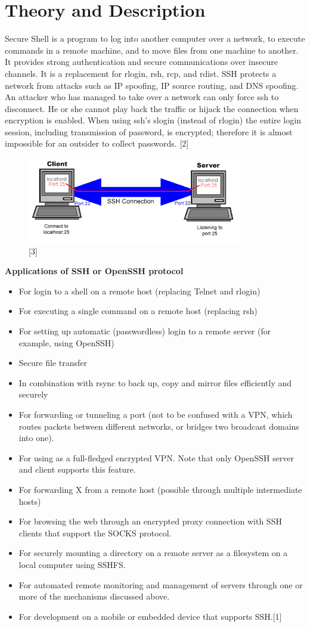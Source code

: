 \documentclass[11pt,a4paper]{article}
\begin{document}
	\section{Theory and Description}
	Secure Shell is a program to log into another computer over a network, to execute commands in a remote machine, and to move files from one machine to another. It provides strong authentication and secure communications over insecure channels. It is a replacement for rlogin, rsh, rcp, and rdist.
	SSH protects a network from attacks such as IP spoofing, IP source routing, and DNS spoofing. An attacker who has managed to take over a network can only force ssh to disconnect. He or she cannot play back the traffic or hijack the connection when encryption is enabled.
	When using ssh's slogin (instead of rlogin) the entire login session, including transmission of password, is encrypted; therefore it is almost impossible for an outsider to collect passwords. [2]
	\begin{figure}[h!]
		\includegraphics[scale=0.8]{ssh.png}
		\centering
		\caption{[3]}
	\end{figure}
	\textbf{Applications of SSH or OpenSSH protocol}
	\begin{itemize}
		\item For login to a shell on a remote host (replacing Telnet and rlogin)
		\item For executing a single command on a remote host (replacing rsh)
		\item For setting up automatic (passwordless) login to a remote server (for example, using OpenSSH)
		\item Secure file transfer
		\item In combination with rsync to back up, copy and mirror files efficiently and securely
		\item For forwarding or tunneling a port (not to be confused with a VPN, which routes packets between different networks, or bridges two broadcast domains into one).
		\item For using as a full-fledged encrypted VPN. Note that only OpenSSH server and client supports this feature.
		\item For forwarding X from a remote host (possible through multiple intermediate hosts)
		\item For browsing the web through an encrypted proxy connection with SSH clients that support the SOCKS protocol.
		\item For securely mounting a directory on a remote server as a filesystem on a local computer using SSHFS.
		\item For automated remote monitoring and management of servers through one or more of the mechanisms discussed above.
		\item For development on a mobile or embedded device that supports SSH.[1]
	\end{itemize}
	
\end{document}
